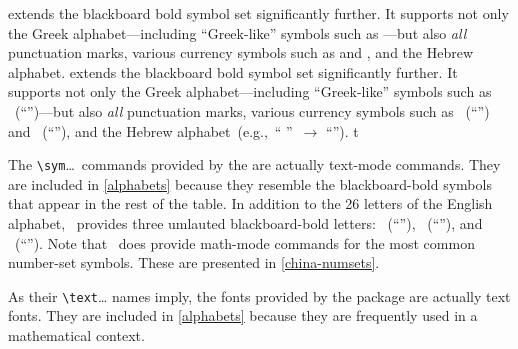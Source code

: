 \begin{center}
\begin{tablenote}[\dag]
  \ifx\MBBmathbb\undefined
     extends the blackboard bold symbol set
    significantly further.  It supports not only the
    Greek
    alphabet---including ``Greek-like'' symbols such as
    \cmd{\bbnabla}---but also \emph{all} punctuation marks, various
    currency
    symbols such as \cmd{\bbdollar} and \cmd{\bbeuro}, and the
    Hebrew alphabet.
  \else
     extends the blackboard bold symbol set
    significantly further.  It supports not only the
    Greek
    alphabet---including ``Greek-like'' symbols such as
    ~(``\bbnabla'')---but also \emph{all} punctuation
    marks, various
    currency
    symbols such as ~(``\bbdollar'') and
    ~(``\bbeuro''),
    and the Hebrew
    alphabet~(e.g.,~``\linebreak[1]%
    \linebreak[1]\linebreak[1]''~$\rightarrow$
    ``\bbfinalnun\bbyod\bbqof\bbpe'').
  \fi    t
\end{tablenote}
\fi

\ifx\symA\undefined\else
\bigskip
\begin{tablenote}[\ddag]
  The \verb|\sym|\dots\ commands provided by the  are
  actually text-mode commands.  They are included in \ref{alphabets}
  because they resemble the blackboard-bold symbols that appear in the
  rest of the table.  In addition to the 26 letters of the English
  alphabet, \CHINA\ provides three umlauted%
  blackboard-bold letters:
  ~(``\symAE''), ~(``\symOE''), and
  ~(``\symUE'').  Note that \CHINA\ does provide
  math-mode commands for the most common number-set symbols.  These
  are presented in \vref{china-numsets}.
\end{tablenote}
\fi

\ifx\textfrak\undefined\else
\bigskip
\begin{tablenote}[\P]
  As their \verb|\text|\dots{} names imply, the fonts provided by the
   package are actually text fonts.  They are
  included in \ref{alphabets} because they are frequently used
  in a mathematical context.
\end{tablenote}
\fi


\end{center}
